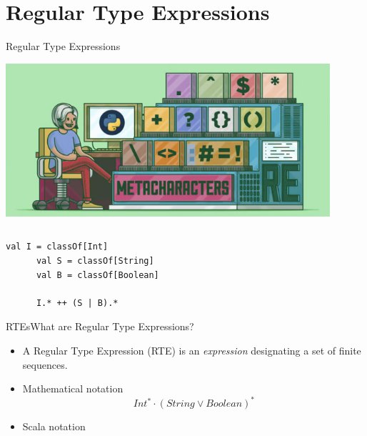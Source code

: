 \section{Regular Type Expressions}

\begin{frame}{Regular Type Expressions}
  \centering
  
  \includegraphics[width=0.9\textwidth]{regexp.png}
\end{frame}


\newsavebox\exnoteabbbox
\begin{lrbox}{\exnoteabbbox}
  \begin{minipage}{7cm}
    \begin{lstlisting}[style=scalaioScala]
    \end{lstlisting}
  \end{minipage}
\end{lrbox}

\newsavebox\exnotebox
\begin{lrbox}{\exnotebox}
  \begin{minipage}{7cm}
    \begin{lstlisting}[style=scalaioScala]
      val I = classOf[Int]
      val S = classOf[String]
      val B = classOf[Boolean]

      I.* ++ (S | B).*
    \end{lstlisting}
  \end{minipage}
\end{lrbox}


\begin{frame}{RTEs}{What are Regular Type Expressions?}
  \begin{itemize}
  \item A Regular Type Expression (RTE) is an \emph{expression} designating a set  of finite sequences.
  \item Mathematical notation
    \[Int^* \cdot (String \vee Boolean)^*\]
  \item Scala notation\\
    \usebox\exnotebox
  \end{itemize}
\end{frame}

